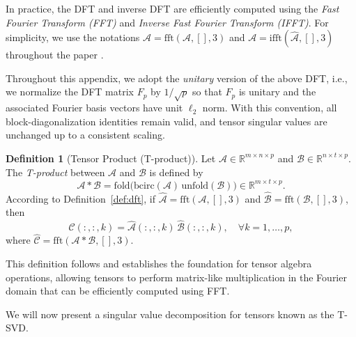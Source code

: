 \documentclass{article}
\theoremstyle{plain}
\theoremstyle{definition}
\newtheorem{definition}[theorem]{Definition}
\theoremstyle{remark}
\begin{document}
In practice, the DFT and inverse DFT are efficiently computed using the \emph{Fast Fourier Transform (FFT)} and \emph{Inverse Fast Fourier Transform (IFFT)}. For simplicity, we use the notations $\widehat{\mathcal{A}}=\mathrm{fft}(\mathcal{A},[],3)$ 
and $\mathcal{A}=\mathrm{ifft}(\widehat{\mathcal{A}},[],3)$ 
throughout the paper \citep{zhang2021note}.

Throughout this appendix, we adopt the \emph{unitary} version of the above DFT, i.e., we normalize the DFT matrix $F_p$ by $1/\sqrt{p}$ so that $F_p$ is unitary and the associated Fourier basis vectors have unit $\ell_2$ norm.
With this convention, all block-diagonalization identities remain valid, and tensor singular values are unchanged up to a consistent scaling.


\begin{definition}[Tensor Product (T-product)]
\label{def:t-product}
Let $\mathcal{A}\in\mathbb{R}^{m\times n\times p}$ and $\mathcal{B}\in\mathbb{R}^{n\times t\times p}$.
The \emph{T-product} between $\mathcal{A}$ and $\mathcal{B}$ is defined by
\[
\mathcal{A} * \mathcal{B}
= \mathrm{fold}\big(\mathrm{bcirc}(\mathcal{A})\,\mathrm{unfold}(\mathcal{B})\big)
\in\mathbb{R}^{m\times t\times p}.
\]
According to Definition~\ref{def:dft}, 
if $\widehat{\mathcal{A}}=\mathrm{fft}(\mathcal{A},[],3)$ and 
$\widehat{\mathcal{B}}=\mathrm{fft}(\mathcal{B},[],3)$,
then
\[
\widehat{\mathcal{C}}(:,:,k)
= \widehat{\mathcal{A}}(:,:,k)\,\widehat{\mathcal{B}}(:,:,k),
\quad
\forall k=1,\dots,p,
\]
where $\widehat{\mathcal{C}}=\mathrm{fft}(\mathcal{A}*\mathcal{B},[],3)$.
\end{definition}
This definition follows \citet{zhang2021note} and establishes the foundation for tensor algebra operations, allowing tensors to perform matrix-like multiplication in the Fourier domain that can be efficiently computed using FFT.

We will now present a singular value decomposition for tensors known as the T-SVD.
\end{document}
